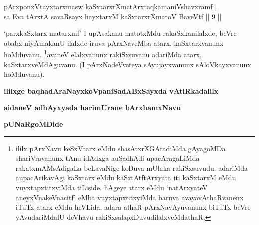
\begin{shl}
pArxponxVtayxtarxmasw kaSxtarxrXmatArxtaqkamaniVshavxramf | \\
sa Eva tArxtA savaRsayx hayxtarxM kaSxtarxrXmatoV BaveVtf \hfill ||  9 ||
\end{shl}


\begin{artha}
`parxkaSxtarx matarxmf' I upAsakanu matotxMdu rakaSxkanilalxde, beVre obabx niyAmakanU ilalxde iruva pArxNaveMba atarx, kaSxtarxvanunx hoMduvanu. \footnote{ililx pArxNavu keSxVtarx eMdu shasAtxrXGAtadiMda gAyagoMDa shariVravanunx tAnu idAdxga auSadhAdi upacAragaLiMda rakatxmAMsAdigaLa beLavaNige koDuva mUlaka rakiSxsuvudu. adariMda aupacArikavAgi kaSxtarx eMdu kaSxtAtftArxyata iti kaSxtarxM eMdu vuyxtapxtitxyiMda tiLiside. hAgeye atarx eMdu `natArxyateV aneyxVnakeVnacitf' eMba vuyxtapxtitxyiMda baruva avayavAthaRvanenx iTuTx atarx eMdu heVLida, adara athaR pArxNavAyuvanunx biTuTx beVre yAvudariMdalU deVhavu rakiSxsalapxDuvudilalxveMdathaR.}avaneV elalxvanunx rakiSxsuvanu adariMda atarx, kaSxtarxveMdAguvanu. (I pArxNadeVvateya sAyujayxvanunx sAloVkayxvanunx hoMduvanu).
\end{artha}

\begin{center}
{\bf ililxge baqhadAraNayxkoVpaniSadABxSayxda vAtiRkadalilx}

\smallskip
{\bf aidaneV adhAyxyada harimUrane bArxhamxNavu}

\smallskip
{\bf pUNaRgoMDide}
\end{center}
